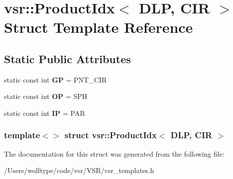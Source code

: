 \hypertarget{structvsr_1_1_product_idx_3_01_d_l_p_00_01_c_i_r_01_4}{\section{vsr\-:\-:Product\-Idx$<$ D\-L\-P, C\-I\-R $>$ Struct Template Reference}
\label{structvsr_1_1_product_idx_3_01_d_l_p_00_01_c_i_r_01_4}
}
\subsection*{Static Public Attributes}
\begin{DoxyCompactItemize}
\item 
\hypertarget{structvsr_1_1_product_idx_3_01_d_l_p_00_01_c_i_r_01_4_ac86998433e37a2521ac9505ad908446f}{static const int {\bfseries G\-P} = P\-N\-T\-\_\-\-C\-I\-R}\label{structvsr_1_1_product_idx_3_01_d_l_p_00_01_c_i_r_01_4_ac86998433e37a2521ac9505ad908446f}

\item 
\hypertarget{structvsr_1_1_product_idx_3_01_d_l_p_00_01_c_i_r_01_4_a0780b7234677eac1cc25ed122da08ee9}{static const int {\bfseries O\-P} = S\-P\-H}\label{structvsr_1_1_product_idx_3_01_d_l_p_00_01_c_i_r_01_4_a0780b7234677eac1cc25ed122da08ee9}

\item 
\hypertarget{structvsr_1_1_product_idx_3_01_d_l_p_00_01_c_i_r_01_4_ac60477d0ccaed563c1702a861b665e91}{static const int {\bfseries I\-P} = P\-A\-R}\label{structvsr_1_1_product_idx_3_01_d_l_p_00_01_c_i_r_01_4_ac60477d0ccaed563c1702a861b665e91}

\end{DoxyCompactItemize}
\subsubsection*{template$<$$>$ struct vsr\-::\-Product\-Idx$<$ D\-L\-P, C\-I\-R $>$}



The documentation for this struct was generated from the following file\-:\begin{DoxyCompactItemize}
\item 
/\-Users/wolftype/code/vsr/\-V\-S\-R/vsr\-\_\-templates.\-h\end{DoxyCompactItemize}
